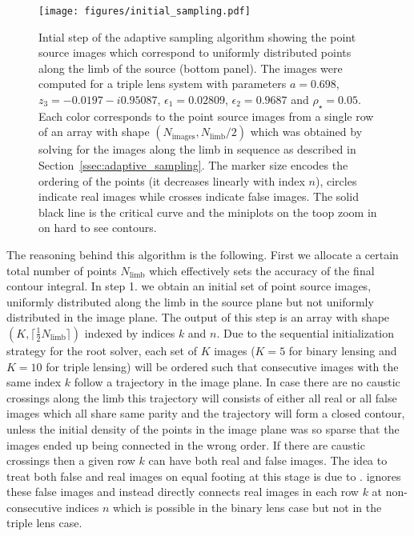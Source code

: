 \documentclass[12pt,dvipsnames]{report}
\begin{document}
\begin{figure}[!t]
    \begin{centering}
        \texttt{[image: figures/initial\_sampling.pdf]}
        \caption{Intial step of the adaptive sampling algorithm showing the point source
        images which correspond to uniformly distributed points along the limb of the source
        (bottom panel).
The images were computed for a triple lens system with parameters $a=0.698$, 
$z_3=-0.0197 - i0.95087$, $\epsilon_1=0.02809$, $\epsilon_2=0.9687$ and $\rho_\star=0.05$.
Each color corresponds to the point source images from a single row of an array with 
shape $(N_\mathrm{images}, N_\mathrm{limb}/2)$ which was obtained by solving for the 
images along the limb in sequence as described in Section~\ref{ssec:adaptive_sampling}. 
The marker size encodes the ordering of the points (it decreases linearly with index $n$), 
circles indicate real images while crosses indicate false images.
The solid black line is the critical curve and the miniplots on the toop zoom in on hard to 
see contours.}
        \label{fig:initial_sampling}
    \end{centering}
\end{figure}

The reasoning behind this algorithm is the following. First we allocate a certain total number
of points $N_\mathrm{limb}$ which effectively sets the accuracy of the final contour integral.
In step 1. we obtain an initial set of point source images, uniformly distributed along the limb 
in the source plane but not uniformly distributed in the image plane. The output of this step 
is an array with shape $(K, \lceil\frac{1}{2}N_\mathrm{limb}\rceil)$ indexed by indices $k$ and $n$.
Due to the sequential initialization strategy for the root solver, each set of $K$ images 
($K=5$ for binary lensing and $K=10$ for triple lensing) will be ordered such that 
consecutive images with the same index $k$ follow a trajectory in the image plane. In case 
there are no caustic crossings along the limb this trajectory will consists of either all 
real or all false images which all share same parity and the trajectory will
form a closed contour, unless the initial density of the points in the image plane was so sparse
that the images ended up being connected in the wrong order. If there are caustic crossings 
then a given row $k$ can have both real and false images.
The idea to treat both false and real images on equal footing at this stage is due to 
\citet{2021MNRAS.503.6143K}. \citet{2010MNRAS.408.2188B} ignores these false images and 
instead directly connects real images in each row $k$ at non-consecutive indices $n$ which 
is possible in the binary lens case but not in the triple lens case. 
\end{document}
